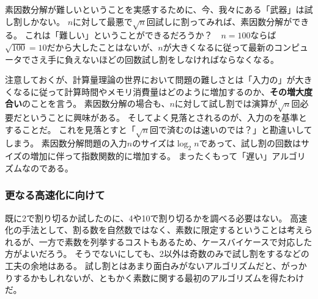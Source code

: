 素因数分解が難しいということを実感するために、今、我々にある「武器」は試し割しかない。
$n$に対して最悪で$\sqrt{n}$回試しに割ってみれば、素因数分解ができる。
これは「難しい」ということができるだろうか？　$n=100$ならば$\sqrt{100}=10$だから大したことはないが、$n$が大きくなるに従って最新のコンピュータでさえ手に負えないほどの回数試し割をしなければならなくなる。

注意しておくが、計算量理論の世界において問題の難しさとは「入力の」が大きくなるに従って計算時間やメモリ消費量はどのように増加するのか、\textbf{その増大度合い}のことを言う。
素因数分解の場合も、$n$に対して試し割では演算が$\sqrt{n}$回必要だということに興味がある。
そしてよく見落とされるのが、入力のを基準とすることだ。
これを見落とすと「$\sqrt{n}$回で済むのは速いのでは？」と勘違いしてしまう。
素因数分解問題の入力$n$のサイズは$\log_2{n}$であって、試し割の回数はサイズの増加に伴って指数関数的に増加する。
まったくもって「遅い」アルゴリズムなのである。

\subsubsection{更なる高速化に向けて}
既に2で割り切るか試したのに、4や10で割り切るかを調べる必要はない。
高速化の手法として、割る数を自然数ではなく、素数に限定するということは考えられるが、一方で素数を列挙するコストもあるため、ケースバイケースで対応した方がよいだろう。
そうでないにしても、2以外は奇数のみで試し割をするなどの工夫の余地はある。
試し割とはあまり面白みがないアルゴリズムだと、がっかりするかもしれないが、ともかく素数に関する最初のアルゴリズムを得たわけだ。

